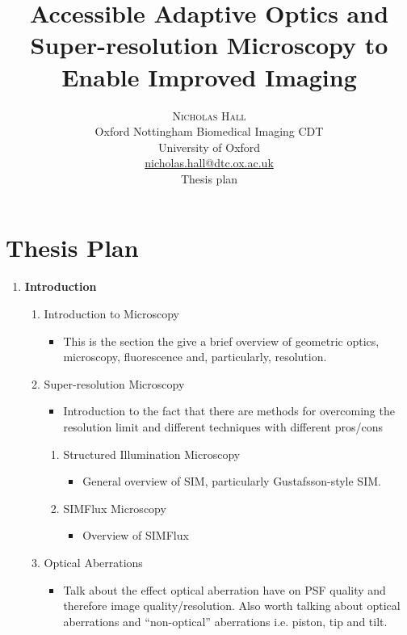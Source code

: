 \documentclass[twoside,onecolumn]{article}
\title{Accessible Adaptive Optics and Super-resolution Microscopy to Enable Improved Imaging} %
\author{%
\textsc{Nicholas Hall} \\[1ex] %
\normalsize Oxford Nottingham Biomedical Imaging CDT \\ %
\normalsize University of Oxford \\ %
\normalsize \href{mailto:nicholas.hall@dtc.ox.ac.uk}{nicholas.hall@dtc.ox.ac.uk} \\ %
\normalsize Thesis plan
}
\date{} %
\begin{document}
\maketitle


\section{Thesis Plan}


\begin{enumerate}[label*=\arabic*.]
	
	\item \textbf{Introduction}
	\begin{enumerate}[label*=\arabic*.]
		\item Introduction to Microscopy
		\begin{itemize}
			\item This is the section the give a brief overview of geometric optics, microscopy, fluorescence and, particularly, resolution.
		\end{itemize}
		\item Super-resolution Microscopy
		\begin{itemize}
			\item Introduction to the fact that there are methods for overcoming the resolution limit and different techniques with different pros/cons
		\end{itemize}
		\begin{enumerate}[label*=\arabic*.]
			\item Structured Illumination Microscopy
			\begin{itemize}
				\item General overview of SIM, particularly Gustafsson-style SIM.
			\end{itemize}
			\item SIMFlux Microscopy
			\begin{itemize}
				\item Overview of SIMFlux
			\end{itemize}
		\end{enumerate}
		\item Optical Aberrations
		\begin{itemize}
			\item Talk about the effect optical aberration have on PSF quality and therefore image quality/resolution. Also worth talking about optical aberrations and ``non-optical'' aberrations i.e. piston, tip and tilt.

\end{itemize}
\end{enumerate}
\end{enumerate}
\end{document}
